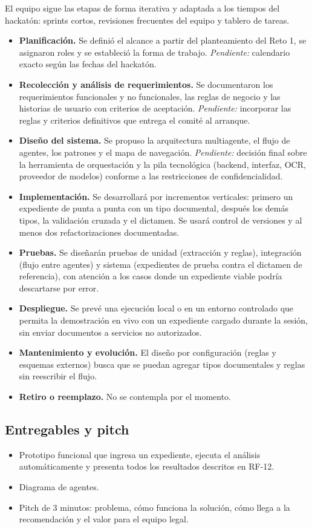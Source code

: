 \documentclass[11pt, a4paper]{article}
\begin{document}
El equipo sigue las etapas de forma iterativa y adaptada a los tiempos del hackatón: sprints cortos, revisiones frecuentes del equipo y tablero de tareas.

\begin{itemize}
    \item \textbf{Planificación.} Se definió el alcance a partir del planteamiento del Reto 1, se asignaron roles y se estableció la forma de trabajo. \textit{Pendiente:} calendario exacto según las fechas del hackatón.
    \item \textbf{Recolección y análisis de requerimientos.} Se documentaron los requerimientos funcionales y no funcionales, las reglas de negocio y las historias de usuario con criterios de aceptación. \textit{Pendiente:} incorporar las reglas y criterios definitivos que entrega el comité al arranque.
    \item \textbf{Diseño del sistema.} Se propuso la arquitectura multiagente, el flujo de agentes, los patrones y el mapa de navegación. \textit{Pendiente:} decisión final sobre la herramienta de orquestación y la pila tecnológica (backend, interfaz, OCR, proveedor de modelos) conforme a las restricciones de confidencialidad.
    \item \textbf{Implementación.} Se desarrollará por incrementos verticales: primero un expediente de punta a punta con un tipo documental, después los demás tipos, la validación cruzada y el dictamen. Se usará control de versiones y al menos dos refactorizaciones documentadas.
    \item \textbf{Pruebas.} Se diseñarán pruebas de unidad (extracción y reglas), integración (flujo entre agentes) y sistema (expedientes de prueba contra el dictamen de referencia), con atención a los casos donde un expediente viable podría descartarse por error.
    \item \textbf{Despliegue.} Se prevé una ejecución local o en un entorno controlado que permita la demostración en vivo con un expediente cargado durante la sesión, sin enviar documentos a servicios no autorizados.
    \item \textbf{Mantenimiento y evolución.} El diseño por configuración (reglas y esquemas externos) busca que se puedan agregar tipos documentales y reglas sin reescribir el flujo.
    \item \textbf{Retiro o reemplazo.} No se contempla por el momento.
\end{itemize}

\subsection*{Entregables y pitch}
\begin{itemize}
    \item Prototipo funcional que ingresa un expediente, ejecuta el análisis automáticamente y presenta todos los resultados descritos en RF-12.
    \item Diagrama de agentes.
    \item Pitch de 3 minutos: problema, cómo funciona la solución, cómo llega a la recomendación y el valor para el equipo legal.
\end{itemize}
\end{document}
